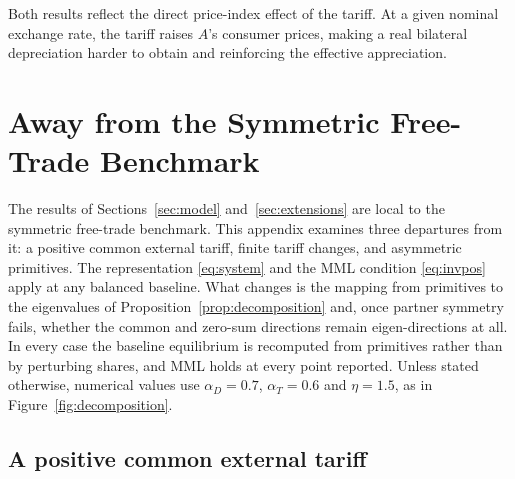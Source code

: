\documentclass[11pt]{article}
\begin{document}
\noindent Both results reflect the direct price-index effect of the tariff. At a given nominal exchange rate, the tariff raises $A$'s consumer prices, making a real bilateral depreciation harder to obtain and reinforcing the effective appreciation.

\section{Away from the Symmetric Free-Trade Benchmark}

\label{app:asym}

The results of Sections~\ref{sec:model} and~\ref{sec:extensions} are local to the symmetric free-trade benchmark. This appendix examines three departures from it: a positive common external tariff, finite tariff changes, and asymmetric primitives. The representation \eqref{eq:system} and the MML condition \eqref{eq:invpos} apply at any balanced baseline. What changes is the mapping from primitives to the eigenvalues of Proposition~\ref{prop:decomposition} and, once partner symmetry fails, whether the common and zero-sum directions remain eigen-directions at all. In every case the baseline equilibrium is recomputed from primitives rather than by perturbing shares, and MML holds at every point reported. Unless stated otherwise, numerical values use $\alpha_D=0.7$, $\alpha_T=0.6$ and $\eta=1.5$, as in Figure~\ref{fig:decomposition}.

\subsection{A positive common external tariff}
\label{app:asym-tariff}
\end{document}
